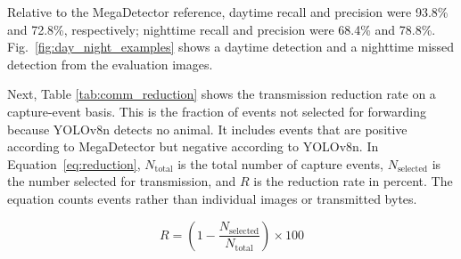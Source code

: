\documentclass[conference]{IEEEtran}
\begin{document}
\begin{table}[tb]
    \caption{Event-Level Agreement with MegaDetector (YOLO: 0.05; MD: 0.25)}
    \label{tab:ai_accuracy}
        \begin{center}\footnotesize
    \end{center}
    \end{table}

Relative to the MegaDetector reference, daytime recall and precision were 93.8\% and 72.8\%, respectively; nighttime recall and precision were 68.4\% and 78.8\%.
Fig.~\ref{fig:day_night_examples} shows a daytime detection and a nighttime missed detection from the evaluation images.

Next, Table \ref{tab:comm_reduction} shows the transmission reduction rate on a capture-event basis. This is the fraction of events not selected for forwarding because YOLOv8n detects no animal. It includes events that are positive according to MegaDetector but negative according to YOLOv8n. In Equation~\ref{eq:reduction}, $N_{\mathrm{total}}$ is the total number of capture events, $N_{\mathrm{selected}}$ is the number selected for transmission, and $R$ is the reduction rate in percent. The equation counts events rather than individual images or transmitted bytes.

\begin{equation}
    R = \left( 1 - \frac{N_{\mathrm{selected}}}{N_{\mathrm{total}}} \right) \times 100 \label{eq:reduction}
\end{equation}
\end{document}
